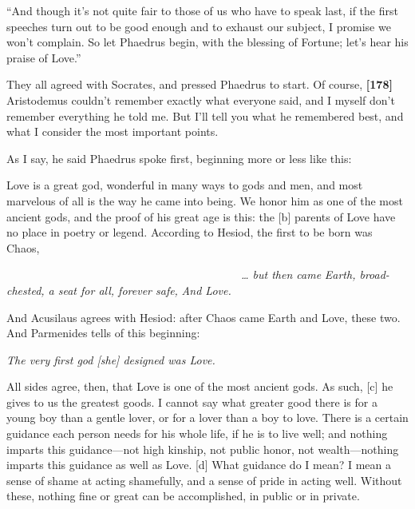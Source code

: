“And though it's not quite fair to those of us who have to speak last,
if the first speeches turn out to be good enough and to exhaust our
subject, I promise we won't complain. So let Phaedrus begin, with the
blessing of Fortune; let's hear his praise of Love.”

They all agreed with Socrates, and pressed Phaedrus to start. Of course,
{\bf {[}178{]}} Aristodemus couldn't remember exactly what everyone
said, and I myself don't remember everything he told me. But I'll tell
you what he remembered best, and what I consider the most important
points.

As I say, he said Phaedrus spoke first, beginning more or less like
this:\crlf
\crlf

Love is a great god, wonderful in many ways to gods and men, and most
marvelous of all is the way he came into being. We honor him as one of
the most ancient gods, and the proof of his great age is this: the
{[}b{]} parents of Love have no place in poetry or legend. According to
Hesiod, the first to be born was Chaos,\crlf
\crlf

~~~~~~~~~~~~~~~~~~~~~~~~~~~~~~~~~~~~~~~~~~{\em \ldots{} but then came}
{\em Earth, broad-chested, a seat for all, forever safe,} {\em And
Love.}\crlf
\crlf

And Acusilaus agrees with Hesiod: after Chaos came Earth and Love, these
two. And Parmenides
tells of this beginning:\crlf
\crlf

{\em The very first god {[}she{]} designed was
Love.}\crlf
\crlf

All sides agree, then, that Love is one of the most ancient gods. As
such, {[}c{]} he gives to us the greatest goods. I cannot say what
greater good there is for a young boy than a gentle lover, or for a
lover than a boy to love. There is a certain guidance each person needs
for his whole life, if he is to live well; and nothing imparts this
guidance---not high kinship, not public honor, not wealth---nothing
imparts this guidance as well as Love. {[}d{]} What guidance do I mean?
I mean a sense of shame at acting shamefully, and a sense of pride in
acting well. Without these, nothing fine or great can be accomplished,
in public or in private.

